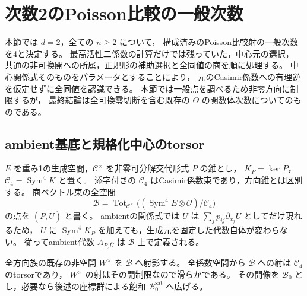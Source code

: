 \section{次数2のPoisson比較の一般次数}
\label{sec:degree-two-shadow-degree}

本節では $d=2$，全ての $n\ge2$ について，
構成済みのPoisson比較射の一般次数を4と決定する。
最高活性二係数の計算だけでは残っていた，中心元の選択，
共通の非可換開への所属，正規形の補助選択と全同値の商を順に処理する。
中心関係式そのものをパラメータとすることにより，
元のCasimir係数への有理逆を仮定せずに全同値を認識できる。
本節では一般点を調べるため非零方向に制限するが，
最終結論は全可換零切断を含む既存の $\Theta$ の関数体次数についてのものである。

\subsection{ambient基底と規格化中心のtorsor}

$E$ を重み1の生成空間，$\mathcal C^\times$ を非零可分解交代形式 $P$ の錐とし，
$K_P=\ker P$，$\mathcal C_4=\operatorname{Sym}^4K$ と置く。
添字付きの $\mathcal C_4$ はCasimir係数束であり，方向錐とは区別する。
商ベクトル束の全空間
\[
 \mathcal B=\operatorname{Tot}_{\mathcal C^\times}
        \bigl((\operatorname{Sym}^4E\otimes\mathcal O)/\mathcal C_4\bigr)
\]
の点を $(P,\overline U)$ と書く。
ambientの関係式では $U$ は $\sum_jp_{ij}\partial_{x_j}U$ としてだけ現れるため，
$U$ に $\operatorname{Sym}^4K_P$ を加えても，生成元を固定した代数自体が変わらない。
従ってambient代数 $A_{P,\overline U}$ は $\mathcal B$ 上で定義される。

全方向族の既存の非空開 $W^\times$ を $\mathcal B$ へ射影する。
全係数空間から $\mathcal B$ への射は $\mathcal C_4$ のtorsorであり，
$W^\times$ の射はその開制限なので滑らかである。
その開像を $\mathcal B_0$ とし，必要なら後述の座標群による飽和
$\mathcal B_0^{\mathrm{sat}}$ へ広げる。

